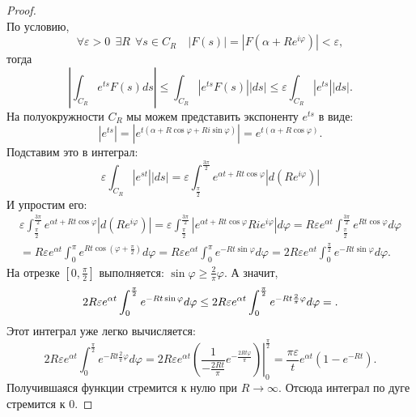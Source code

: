 \documentclass[../paper.tex]{subfile}
\begin{document}
\begin{proof} $ $ \\
%


По условию, 
\[
	\forall \varepsilon > 0 \ \  \exists R \ \ \forall s \in C_R \quad \left| F(s) \right| = \left| F\left(\alpha + Re^{i\varphi}\right) \right|  < \varepsilon
,\] тогда
\[
	\left|\int_{C_R} e^{ts} F(s) ds\right|
	\le \int_{C_R} \left|e^{ts} F(s)\right| |ds|
	\le \varepsilon \int_{C_R} \left|e^{ts}\right| |ds|
.\]
На полуокружности $C_R$ мы можем представить экспоненту $e^{ts}$ в виде:
\[
	\left|e^{ts}\right|
	= \left|e^{t\left(\alpha+R\cos\varphi+Ri\sin\varphi\right)}\right|
	= e^{t\left(\alpha + R\cos\varphi\right)}
.\]
Подставим это в интеграл:
\[
	\varepsilon \int_{C_R} \left|e^{st}\right| |ds|
	= \varepsilon \int_{\frac{\pi}{2}}^{\frac{3\pi}{2}} e^{\alpha t + R t \cos \varphi} \left|d\left(Re^{i\varphi}\right)\right|
\]
И упростим его:
\begin{multline*}
	\varepsilon \int_{\frac{\pi}{2}}^{\frac{3\pi}{2}} e^{\alpha t + R t \cos \varphi} \left|d\left(Re^{i\varphi}\right)\right|
	= \varepsilon \int_{\frac{\pi}{2}}^{\frac{3\pi}{2}} \left|e^{\alpha t + R t \cos \varphi} R i e^{i\varphi} \right| d\varphi
	= R\varepsilon e^{\alpha t} \int_{\frac{\pi}{2}}^{\frac{3\pi}{2}} e^{R t \cos\varphi} d\varphi
	\\= R\varepsilon e^{\alpha t} \int_{0}^{\pi} e^{R t \cos \left(\varphi + \frac{\pi}{2}\right)} d\varphi
	= R\varepsilon e^{\alpha t} \int_{0}^{\pi} e^{-R t \sin\varphi} d\varphi
	= 2R\varepsilon e^{\alpha t} \int_{0}^{\frac{\pi}{2}} e^{-R t \sin\varphi} d\varphi
.\end{multline*}
На отрезке $[0, \frac{\pi}{2}]$ выполняется: $\sin\varphi \ge \frac{2}{\pi} \varphi$.
А значит,
\[
	2R\varepsilon e^{\alpha t} \int_{0}^{\frac{\pi}{2}} e^{-R t \sin\varphi} d\varphi
	\le 2R\varepsilon e^{\alpha t} \int_{0}^{\frac{\pi}{2}} e^{-R t \frac{2}{\pi}\varphi} d\varphi = \\
.\]
Этот интеграл уже легко вычисляется:
\[
	2R\varepsilon e^{\alpha t} \int_{0}^{\frac{\pi}{2}} e^{-R t \frac{2}{\pi}\varphi} d\varphi
	= 2R\varepsilon e^{\alpha t} \left.\left( \frac{1}{-\frac{2Rt}{\pi}}e^{- \frac{2 R t \varphi}{\pi}} \right) \right|_0^{\frac{\pi}{2}} 
        = \frac{\pi\varepsilon}{t} e^{\alpha t} \left(1 - e^{- R t} \right)
.\]
Получившаяся функции стремится к нулю при $R \to \infty$.
Отсюда интеграл по дуге стремится к $0$.
\end{proof}
\end{document}
